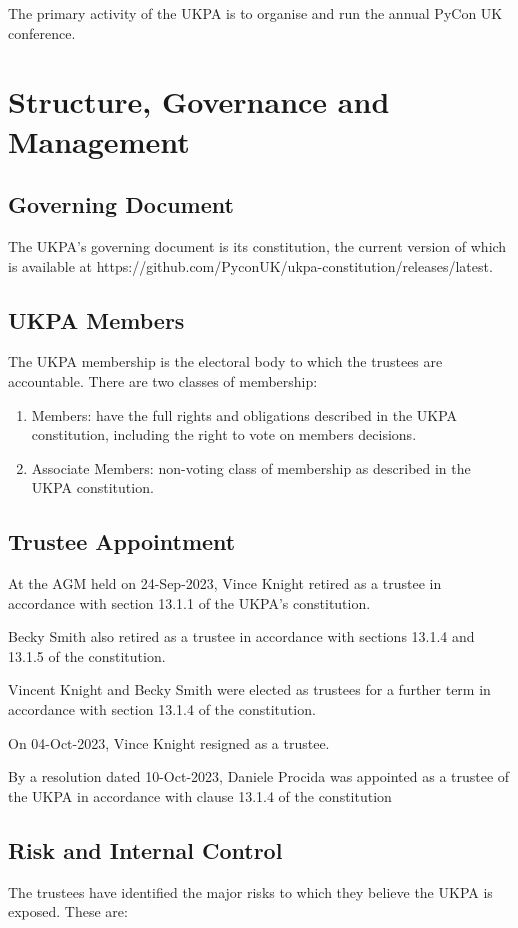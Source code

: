 \documentclass[11pt, final]{article}
\begin{document}
The primary activity of the UKPA is to organise and run the annual PyCon UK conference.

\section{Structure, Governance and Management}

\subsection{Governing Document}
The UKPA's governing document is its constitution, the current version of which is available at https://github.com/PyconUK/ukpa-constitution/releases/latest.

\subsection{UKPA Members}
The UKPA membership is the electoral body to which the trustees are accountable.
There are two classes of membership:

\begin{enumerate}
	\item Members: have the full rights and obligations described in the UKPA constitution, including the right to vote on members decisions.
	\item Associate Members: non-voting class of membership as described in the UKPA constitution.
\end{enumerate}

\subsection{Trustee Appointment}
At the AGM held on 24-Sep-2023, Vince Knight retired as a trustee in accordance with section 13.1.1 of the UKPA's constitution.

Becky Smith also retired as a trustee in accordance with sections 13.1.4 and 13.1.5 of the constitution.

Vincent Knight and Becky Smith were elected as trustees for a further term in accordance with section 13.1.4 of the constitution.

On 04-Oct-2023, Vince Knight resigned as a trustee.

By a resolution dated 10-Oct-2023, Daniele Procida was appointed as a trustee of the UKPA in accordance with clause 13.1.4 of the constitution
\subsection{Risk and Internal Control}
The trustees have identified the major risks to which they believe the UKPA is exposed. These are:
\end{document}
